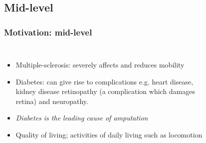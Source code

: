 \documentclass[aspectratio=169]{beamer}
\begin{document}


\begin{frame}[plain]
\subsection{Mid-level}
\frametitle{Motivation: mid-level}
\begin{columns}[t] %

    \begin{itemize}
        \item Multiple-sclerosis: severely affects and reduces mobility 
        \item Diabetes: can give rise to complications e.g. heart disease, kidney disease
            retinopathy (a complication which damages retina) and neuropathy. 
        \item {\it Diabetes is the leading cause of amputation} 
        \item Quality of living; activities of daily living such as locomotion
    \end{itemize}
\begin{figure}[ht]
    \\[-0em]
\end{figure}
\end{columns}
\end{frame}

\end{document}
